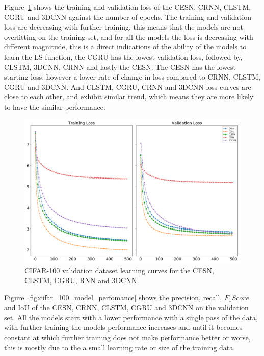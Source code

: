 \documentclass{WitsPhysicsReport}
\begin{document}
Figure~\ref{fig:cifar_100_model_loss} shows the training and validation loss of the CESN, CRNN, CLSTM, CGRU and 3DCNN against the number of epochs. The training and validation loss are decreasing with further training, this means that the models are not overfitting on the training set, and for all the models the loss is decreasing with different magnitude, this is a direct indications of the ability of the models to learn the LS function, the CGRU has the lowest validation loss, followed by, CLSTM, 3DCNN, CRNN and lastly the CESN. The CESN has the lowest starting loss, however a lower rate of change in loss compared to CRNN, CLSTM, CGRU and 3DCNN. And CLSTM, CGRU, CRNN and 3DCNN loss curves are close to each other, and exhibit similar trend, which means they are more likely to have the similar performance.

\begin{figure}[H]
\centering
  \includegraphics[width=1\textwidth]{Figure/Results/CIFAR_10_loss.png}
\caption{CIFAR-100 validation dataset learning curves for the CESN, CLSTM, CGRU, RNN and 3DCNN}
 \label{fig:cifar_100_model_loss}
\end{figure}


Figure~\ref{fig:cifar_100_model_perfomance} shows the precision, recall, $F_{1}Score$ and IoU of the CESN, CRNN, CLSTM, CGRU and 3DCNN on the validation set. All the models start with a lower performance with a single pass of the data, with further training the models performance increases and until it becomes constant at which further training does not make performance better or worse, this is mostly due to the a small learning rate or size of the training data.
\end{document}
